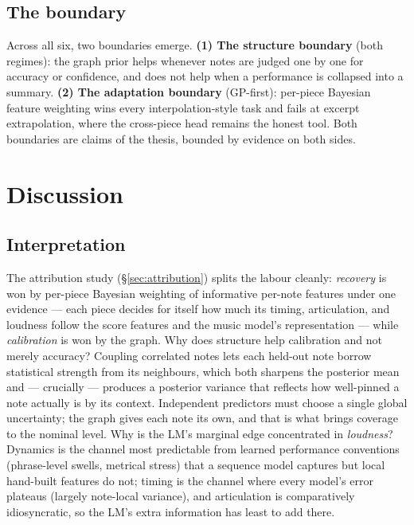 \documentclass[11pt,a4paper]{report}
\begin{document}
\section{The boundary}\label{sec:boundary}
Across all six, two boundaries emerge. \textbf{(1) The structure boundary} (both
regimes): the graph prior helps whenever notes are judged one by one for accuracy
or confidence, and does not help when a performance is collapsed into a summary.
\textbf{(2) The adaptation boundary} (GP-first): per-piece Bayesian feature
weighting wins every interpolation-style task and fails at excerpt extrapolation,
where the cross-piece head remains the honest tool. Both boundaries are claims of
the thesis, bounded by evidence on both sides.

\chapter{Discussion}\label{ch:discussion}

\section{Interpretation}
The attribution study (\S\ref{sec:attribution}) splits the labour cleanly:
\emph{recovery} is won by per-piece Bayesian weighting of informative per-note
features under one evidence --- each piece decides for itself how much its timing,
articulation, and loudness follow the score features and the music model's
representation --- while \emph{calibration} is won by the graph. Why does structure
help calibration and not merely accuracy? Coupling
correlated notes lets each held-out note borrow statistical strength from its
neighbours, which both sharpens the posterior mean and --- crucially --- produces a
posterior variance that reflects how well-pinned a note actually is by its context.
Independent predictors must choose a single global uncertainty; the graph gives each
note its own, and that is what brings coverage to the nominal level. Why is the
LM's marginal edge concentrated in \emph{loudness}? Dynamics is the channel most
predictable from learned performance conventions (phrase-level swells,
metrical stress) that a sequence model captures but local hand-built features do
not; timing is the channel where every model's error plateaus (largely note-local
variance), and articulation is comparatively idiosyncratic, so the LM's extra
information has least to add there.
\end{document}
